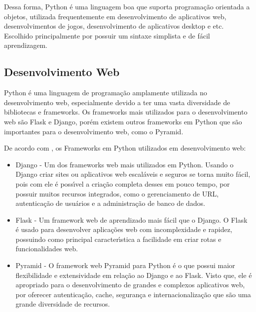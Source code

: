 Dessa forma, Python \'{e} uma linguagem boa que suporta programa\c{c}\~{a}o orientada a objetos, utilizada frequentemente em desenvolvimento de aplicativos web, desenvolvimentos de jogos, desenvolvimento de aplicativos desktop e etc. Escolhido principalmente por possuir um sintaxe simplista e de f\'{a}cil aprendizagem.
       
		\subsection{Desenvolvimento Web}
Python \'{e} uma linguagem de programa\c{c}\~{a}o amplamente utilizada no desenvolvimento web, especialmente devido a ter uma vasta diversidade de bibliotecas e frameworks. Os frameworks mais utilizados para o desenvolvimento web s\~{a}o Flask e Django, por\'{e}m existem outros frameworks em Python que s\~{a}o importantes para o desenvolvimento web, como o Pyramid.

De acordo com \cite{BarrosMaciel2020}, os Frameworks em Python utilizados em desenvolvimento web:

\begin{itemize} [itemsep=5pt, parsep=5pt]

\item Django - Um dos frameworks web mais utilizados em Python. Usando o Django criar sites ou aplicativos web escal\'{a}veis e seguros se torna muito f\'{a}cil, pois com ele \'{e} poss\'{\i}vel a cria\c{c}\~{a}o completa desses em pouco tempo, por possuir muitos recursos integrados, como o gerenciamento de URL, autentica\c{c}\~{a}o de usu\'{a}rios e a administra\c{c}\~{a}o de banco de dados.  

\item Flask - Um framework web de aprendizado mais f\'{a}cil que o Django. O Flask \'{e} usado para desenvolver aplica\c{c}\~{o}es web com incomplexidade e rapidez, possuindo como principal caracter\'{\i}stica a facilidade em criar rotas e funcionalidades web.

\item Pyramid - O framework web Pyramid para Python \'{e} o que possui maior flexibilidade e extensividade em rela\c{c}\~{a}o ao Django e ao Flask. Visto que, ele \'{e} apropriado para o desenvolvimento de grandes e complexos aplicativos web, por oferecer autentica\c{c}\~{a}o, cache, seguran\c{c}a e internacionaliza\c{c}\~{a}o que s\~{a}o uma grande diversidade de recursos.  \newline

\end{itemize}

